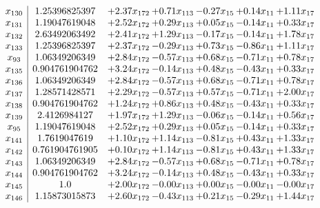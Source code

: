 \documentclass[8pt]{article}
\begin{document}
\[\begin{array}{c| c c@{\hskip 2pt} c@{\hskip 2pt} c@{\hskip 2pt} c@{\hskip 2pt} c@{\hskip 2pt} }
 x_{130}   &  1.25396825397 & +  2.37 x_{172} & +  0.71 x_{113} & -0.27 x_{15} & +  0.14 x_{11} & +  1.11 x_{17}\\
 x_{131}   &  1.19047619048 & +  2.52 x_{172} & +  0.29 x_{113} & +  0.05 x_{15} & -0.14 x_{11} & +  0.33 x_{17}\\
 x_{132}   &  2.63492063492 & +  2.41 x_{172} & +  1.29 x_{113} & -0.17 x_{15} & -0.14 x_{11} & +  1.78 x_{17}\\
 x_{133}   &  1.25396825397 & +  2.37 x_{172} & -0.29 x_{113} & +  0.73 x_{15} & -0.86 x_{11} & +  1.11 x_{17}\\
 x_{93}   &  1.06349206349 & +  2.84 x_{172} & -0.57 x_{113} & +  0.68 x_{15} & -0.71 x_{11} & +  0.78 x_{17}\\
 x_{135}   &  0.904761904762 & +  3.24 x_{172} & -0.14 x_{113} & +  0.48 x_{15} & -0.43 x_{11} & +  0.33 x_{17}\\
 x_{136}   &  1.06349206349 & +  2.84 x_{172} & -0.57 x_{113} & +  0.68 x_{15} & -0.71 x_{11} & +  0.78 x_{17}\\
 x_{137}   &  1.28571428571 & +  2.29 x_{172} & -0.57 x_{113} & +  0.57 x_{15} & -0.71 x_{11} & +  2.00 x_{17}\\
 x_{138}   &  0.904761904762 & +  1.24 x_{172} & +  0.86 x_{113} & +  0.48 x_{15} & -0.43 x_{11} & +  0.33 x_{17}\\
 x_{139}   &  2.4126984127 & +  1.97 x_{172} & +  1.29 x_{113} & -0.06 x_{15} & -0.14 x_{11} & +  0.56 x_{17}\\
 x_{95}   &  1.19047619048 & +  2.52 x_{172} & +  0.29 x_{113} & +  0.05 x_{15} & -0.14 x_{11} & +  0.33 x_{17}\\
 x_{141}   &  1.7619047619 & +  1.10 x_{172} & +  1.14 x_{113} & -0.81 x_{15} & +  0.43 x_{11} & +  1.33 x_{17}\\
 x_{142}   &  0.761904761905 & +  0.10 x_{172} & +  1.14 x_{113} & -0.81 x_{15} & +  0.43 x_{11} & +  1.33 x_{17}\\
 x_{143}   &  1.06349206349 & +  2.84 x_{172} & -0.57 x_{113} & +  0.68 x_{15} & -0.71 x_{11} & +  0.78 x_{17}\\
 x_{144}   &  0.904761904762 & +  3.24 x_{172} & -0.14 x_{113} & +  0.48 x_{15} & -0.43 x_{11} & +  0.33 x_{17}\\
 x_{145}   &  1.0 & +  2.00 x_{172} & -0.00 x_{113} & +  0.00 x_{15} & -0.00 x_{11} & -0.00 x_{17}\\
 x_{146}   &  1.15873015873 & +  2.60 x_{172} & -0.43 x_{113} & +  0.21 x_{15} & -0.29 x_{11} & +  1.44 x_{17}\\

\end{array}\]
\end{document}
